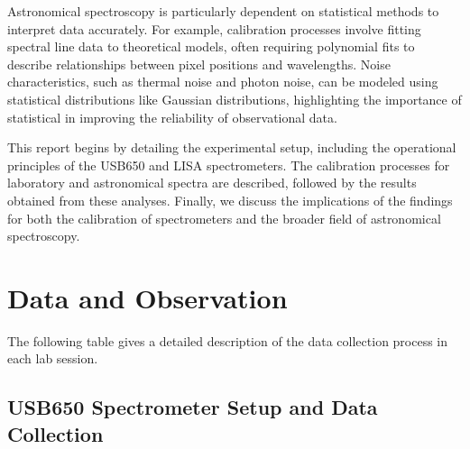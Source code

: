 \documentclass[10pt, preprint]{aastex}
\begin{document}
Astronomical spectroscopy is particularly dependent on statistical methods to interpret data accurately. For example, calibration processes involve fitting spectral line data to theoretical models, often requiring polynomial fits to describe relationships between pixel positions and wavelengths. Noise characteristics, such as thermal noise and photon noise, can be modeled using statistical distributions like Gaussian distributions, highlighting the importance of statistical in improving the reliability of observational data. 

This report begins by detailing the experimental setup, including the operational principles of the USB650 and LISA spectrometers. The calibration processes for laboratory and astronomical spectra are described, followed by the results obtained from these analyses. Finally, we discuss the implications of the findings for both the calibration of spectrometers and the broader field of astronomical spectroscopy.

\section{Data and Observation}
\label{sec:data}
 
The following table gives a detailed description of the data collection process in each lab session.

\begin{table}[H]
\caption{\label{table:Observations}Group D Data Collection Layout for Lab 3}
\end{table}

\subsection{USB650 Spectrometer Setup and Data Collection}
\end{document}
